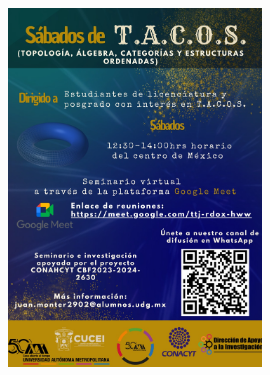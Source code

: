 \documentclass[compress,12pt]{beamer}
\begin{document}
\begin{frame}
    \begin{center}
    \includegraphics[height=9.5cm]{tacos.jpg}
    \end{center}
\end{frame}
\end{document}
